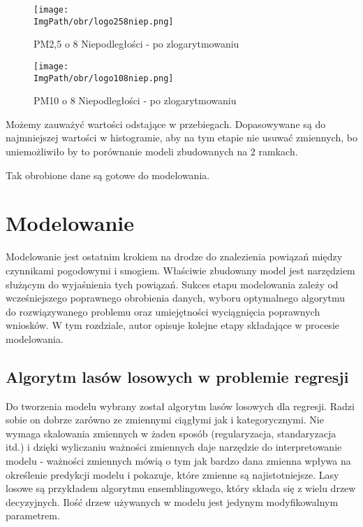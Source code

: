 \documentclass[a4paper,12pt,twoside,openany]{report}
\newcommand{\ImgPath}{.}
\begin{document}
\begin{figure}[H]
	\begin{center}
		\centering
		\texttt{[image: \\ImgPath/obr/logo258niep.png]}
	\end{center}
	\caption{PM2,5 o 8 Niepodległości - po zlogarytmowaniu}
	\label{logo258niep}
\end{figure}

\begin{figure}[H]
	\begin{center}
		\centering
		\texttt{[image: \\ImgPath/obr/logo108niep.png]}
	\end{center}
	\caption{PM10 o 8 Niepodległości - po zlogarytmowaniu}
	\label{logo108niep}
\end{figure}

Możemy zauważyć wartości odstające w przebiegach. Dopasowywane są do najmniejszej wartości w histogramie, aby na tym etapie nie usuwać zmiennych, bo uniemożliwiło by to porównanie modeli zbudowanych na 2 ramkach.

Tak obrobione dane są gotowe do modelowania.

\chapter{Modelowanie}

Modelowanie jest ostatnim krokiem na drodze do znalezienia powiązań między czynnikami pogodowymi i smogiem. Właściwie zbudowany model jest narzędziem służącym do wyjaśnienia tych powiązań. Sukces etapu modelowania zależy od wcześniejszego poprawnego obrobienia danych, wyboru optymalnego algorytmu do rozwiązywanego problemu oraz umiejętności wyciągnięcia poprawnych wniosków. W tym rozdziale, autor opisuje kolejne etapy składające w procesie modelowania.

\section{Algorytm lasów losowych w problemie regresji}

Do tworzenia modelu wybrany został algorytm lasów losowych dla regresji. Radzi sobie on dobrze zarówno ze zmiennymi ciągłymi jak i kategorycznymi. Nie wymaga skalowania zmiennych w żaden sposób (regularyzacja, standaryzacja itd.) i dzięki wyliczaniu ważności zmiennych daje narzędzie do interpretowanie modelu - ważności zmiennych mówią o tym jak bardzo dana zmienna wpływa na określenie predykcji modelu i pokazuje, które zmienne są najistotniejsze. Lasy losowe są przykładem algorytmu ensemblingowego, który składa się z wielu drzew decyzyjnych. Ilość drzew używanych w modelu jest jedynym modyfikowalnym parametrem.
\end{document}
